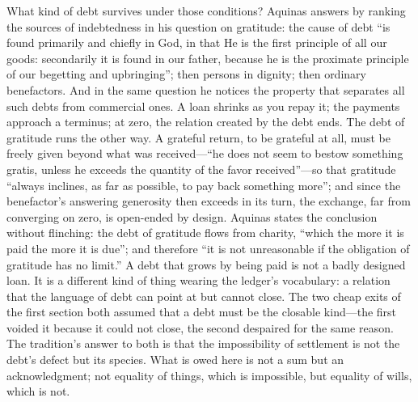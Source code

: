 What kind of debt survives under those conditions? Aquinas answers by ranking the sources of indebtedness in his question on gratitude: the cause of debt ``is found primarily and chiefly in God, in that He is the first principle of all our goods: secondarily it is found in our father, because he is the proximate principle of our begetting and upbringing''; then persons in dignity; then ordinary benefactors. And in the same question he notices the property that separates all such debts from commercial ones. A loan shrinks as you repay it; the payments approach a terminus; at zero, the relation created by the debt ends. The debt of gratitude runs the other way. A grateful return, to be grateful at all, must be freely given beyond what was received---``he does not seem to bestow something gratis, unless he exceeds the quantity of the favor received''---so that gratitude ``always inclines, as far as possible, to pay back something more''; and since the benefactor's answering generosity then exceeds in its turn, the exchange, far from converging on zero, is open-ended by design. Aquinas states the conclusion without flinching: the debt of gratitude flows from charity, ``which the more it is paid the more it is due''; and therefore ``it is not unreasonable if the obligation of gratitude has no limit.'' A debt that grows by being paid is not a badly designed loan. It is a different kind of thing wearing the ledger's vocabulary: a relation that the language of debt can point at but cannot close. The two cheap exits of the first section both assumed that a debt must be the closable kind---the first voided it because it could not close, the second despaired for the same reason. The tradition's answer to both is that the impossibility of settlement is not the debt's defect but its species. What is owed here is not a sum but an acknowledgment; not equality of things, which is impossible, but equality of wills, which is not.

